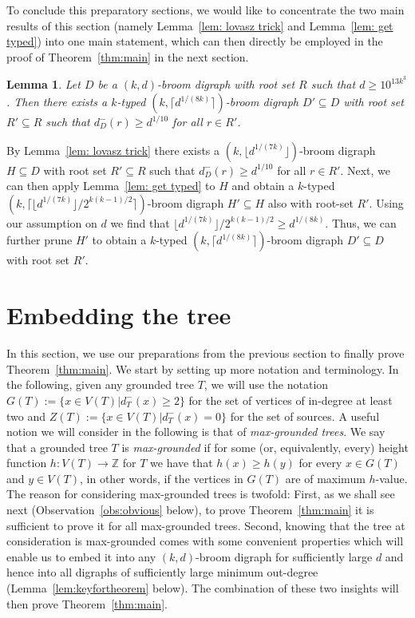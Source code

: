\documentclass[a4paper,11pt]{article}
\makeatletter
\renewenvironment{proof}[1][\proofname] {\par\pushQED{\qed}\normalfont\topsep6\p@\@plus6\p@\relax\trivlist\item[\hskip\labelsep\bfseries#1\@addpunct{.}]\ignorespaces}{\popQED\endtrivlist\@endpefalse}
\newtheorem{lemma}[theorem]{\bf Lemma}
\theoremstyle{definition}
\makeatother
\begin{document}
To conclude this preparatory sections, we would like to concentrate the two main results of this section (namely Lemma~\ref{lem: lovasz trick} and Lemma~\ref{lem: get typed}) into one main statement,  which can then directly be employed in the proof of Theorem~\ref{thm:main} in the next section. 
\begin{lemma}\label{Clean-up}
    Let $D$ be a $(k,d)$-broom digraph with root set $R$ such that $d\ge 10^{13k^3}$. Then there exists a $k$-typed $(k,\lceil d^{1/(8k)}\rceil)$-broom digraph $D'\subseteq D$ with root set $R'\subseteq R$ such that $d_D^-(r)\geq d^{1/10}$ for all $r\in R'$.
\end{lemma}
\begin{proof}
    By Lemma~\ref{lem: lovasz trick} there exists a $(k,\lfloor d^{1/(7k)}\rfloor)$-broom digraph $H\subseteq D$ with root set $R'\subseteq R$ such that $d_D^-(r)\geq d^{1/10}$ for all $r\in R'$. Next, we can then apply Lemma~\ref{lem: get typed} to $H$ and obtain a $k$-typed $(k,\lceil \lfloor d^{1/(7k)}\rfloor/2^{k(k-1)/2}\rceil)$-broom digraph $H'\subseteq H$ also with root-set $R'$. Using our assumption on $d$ we find that $\lfloor d^{1/(7k)}\rfloor/2^{k(k-1)/2}\geq d^{1/(8k)}$. Thus, we can further prune $H'$ to obtain a $k$-typed $(k,\lceil d^{1/(8k)}\rceil)$-broom digraph $D'\subseteq D$ with root set $R'$. 
\end{proof}
\section{Embedding the tree}\label{sec:proof}
In this section, we use our preparations from the previous section to finally prove Theorem~\ref{thm:main}. We start by setting up more notation and terminology. In the following, given any grounded tree $T$, we will use the notation $G(T):=\{x\in V(T)|d_T^-(x)\ge 2\}$ for the set of vertices of in-degree at least two and $Z(T):=\{x\in V(T)|d_T^-(x)=0\}$ for the set of sources. A useful notion we will consider in the following is that of \emph{max-grounded trees}. We say that a grounded tree $T$ is \emph{max-grounded} if for some (or, equivalently, every) height function $h:V(T)\rightarrow \mathbb{Z}$ for $T$ we have that $h(x)\ge h(y)$ for every $x\in G(T)$ and $y\in V(T)$, in other words, if the vertices in $G(T)$ are of maximum $h$-value. The reason for considering max-grounded trees is twofold: First, as we shall see next (Observation~\ref{obs:obvious} below), to prove Theorem~\ref{thm:main} it is sufficient to prove it for all max-grounded trees. Second, knowing that the tree at consideration is max-grounded comes with some convenient properties which will enable us to embed it into any $(k,d)$-broom digraph for sufficiently large $d$ and hence into all digraphs of sufficiently large minimum out-degree (Lemma~\ref{lem:keyfortheorem} below). The combination of these two insights will then prove Theorem~\ref{thm:main}.
\end{document}
